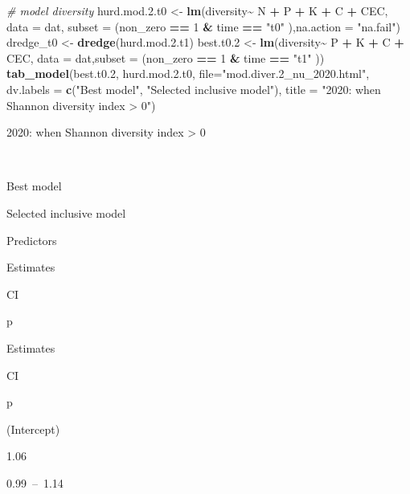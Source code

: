 \documentclass[
]{article}
\newenvironment{Shaded}{\begin{snugshade}}{\end{snugshade}}
\newcommand{\AttributeTok}[1]{\textcolor[rgb]{0.13,0.29,0.53}{#1}}
\newcommand{\CommentTok}[1]{\textcolor[rgb]{0.56,0.35,0.01}{\textit{#1}}}
\newcommand{\DecValTok}[1]{\textcolor[rgb]{0.00,0.00,0.81}{#1}}
\newcommand{\FloatTok}[1]{\textcolor[rgb]{0.00,0.00,0.81}{#1}}
\newcommand{\FunctionTok}[1]{\textcolor[rgb]{0.13,0.29,0.53}{\textbf{#1}}}
\newcommand{\NormalTok}[1]{#1}
\newcommand{\OtherTok}[1]{\textcolor[rgb]{0.56,0.35,0.01}{#1}}
\newcommand{\SpecialCharTok}[1]{\textcolor[rgb]{0.81,0.36,0.00}{\textbf{#1}}}
\newcommand{\StringTok}[1]{\textcolor[rgb]{0.31,0.60,0.02}{#1}}
\begin{document}
\begin{Shaded}
\begin{Highlighting}[]
\CommentTok{\# model diversity}
\NormalTok{hurd.mod.}\FloatTok{2.}\NormalTok{t0 }\OtherTok{\textless{}{-}} \FunctionTok{lm}\NormalTok{(diversity}\SpecialCharTok{\textasciitilde{}}\NormalTok{ N }\SpecialCharTok{+}\NormalTok{ P }\SpecialCharTok{+}\NormalTok{ K }\SpecialCharTok{+}\NormalTok{ C }\SpecialCharTok{+}\NormalTok{ CEC, }\AttributeTok{data =}\NormalTok{ dat, }\AttributeTok{subset =}\NormalTok{ (non\_zero }\SpecialCharTok{==} \DecValTok{1} \SpecialCharTok{\&}\NormalTok{ time }\SpecialCharTok{==} \StringTok{"t0"}\NormalTok{ ),}\AttributeTok{na.action =} \StringTok{"na.fail"}\NormalTok{)}
\NormalTok{dredge\_t0 }\OtherTok{\textless{}{-}} \FunctionTok{dredge}\NormalTok{(hurd.mod.}\FloatTok{2.}\NormalTok{t1)}
\NormalTok{best.t0}\FloatTok{.2} \OtherTok{\textless{}{-}} \FunctionTok{lm}\NormalTok{(diversity}\SpecialCharTok{\textasciitilde{}}\NormalTok{  P }\SpecialCharTok{+}\NormalTok{ K }\SpecialCharTok{+}\NormalTok{ C }\SpecialCharTok{+}\NormalTok{ CEC, }\AttributeTok{data =}\NormalTok{ dat,}\AttributeTok{subset =}\NormalTok{ (non\_zero }\SpecialCharTok{==} \DecValTok{1} \SpecialCharTok{\&}\NormalTok{ time }\SpecialCharTok{==} \StringTok{"t1"}\NormalTok{ ))}
\FunctionTok{tab\_model}\NormalTok{(best.t0}\FloatTok{.2}\NormalTok{, hurd.mod.}\FloatTok{2.}\NormalTok{t0, }\AttributeTok{file=}\StringTok{"mod.diver.2\_nu\_2020.html"}\NormalTok{, }\AttributeTok{dv.labels =} \FunctionTok{c}\NormalTok{(}\StringTok{"Best model"}\NormalTok{, }\StringTok{"Selected inclusive model"}\NormalTok{), }\AttributeTok{title =} \StringTok{"2020: when Shannon diversity index \textgreater{} 0"}\NormalTok{)}
\end{Highlighting}
\end{Shaded}

2020: when Shannon diversity index \textgreater{} 0

~

Best model

Selected inclusive model

Predictors

Estimates

CI

p

Estimates

CI

p

(Intercept)

1.06

0.99~--~1.14
\end{document}
